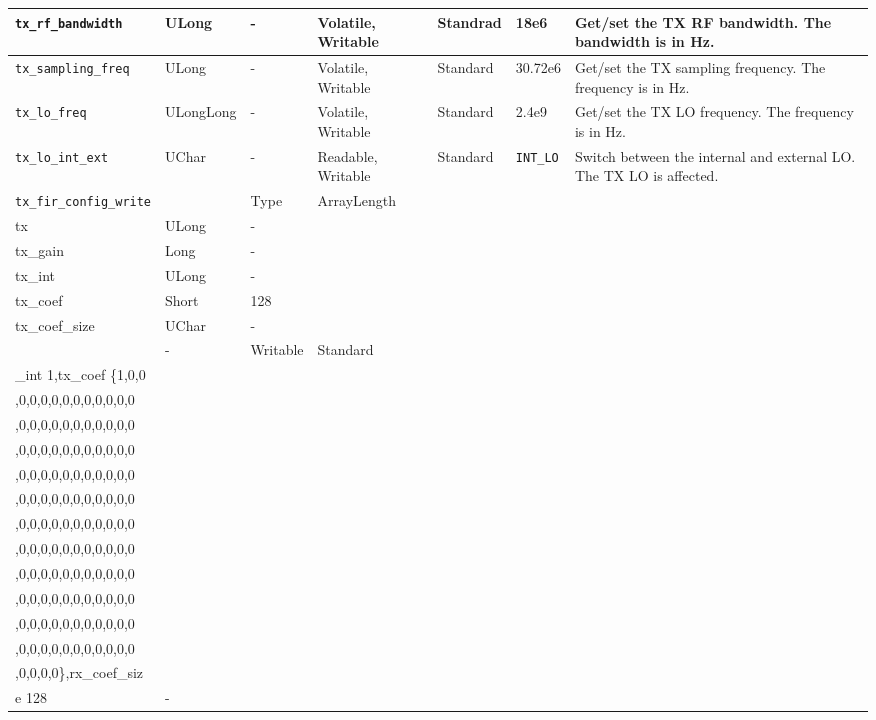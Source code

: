\documentclass{article}
\begin{document}
\begin{landscape}
\begin{scriptsize}
\begin{longtable}{|p{3.6cm}|p{8.1cm}|p{1.4cm}|p{1.3cm}|p{1.4cm}|p{2.5cm}|p{3.6cm}|}
			\hline
			\verb+tx_rf_bandwidth+ & ULong & - & Volatile, Writable & Standrad & 18e6 & Get/set the TX RF bandwidth. The bandwidth is in Hz. \\
			\hline
			\verb+tx_sampling_freq+ & ULong & - & Volatile, Writable & Standard & 30.72e6 & Get/set the TX sampling frequency. The frequency is in Hz. \\
			\hline
			\verb+tx_lo_freq+ & ULongLong & - & Volatile, Writable & Standard & 2.4e9 & Get/set the TX LO frequency. The frequency is in Hz. \\
			\hline
			\verb+tx_lo_int_ext+ & UChar & - & Readable, Writable & Standard & \verb+INT_LO+ & Switch between the internal and external LO. The TX LO is affected. \\
			\hline
			\verb+tx_fir_config_write+ & \begin{tabular}{|p{2.2cm}|p{2.7cm}|p{1.7cm}|} \hline \cellcolor{blue} Name & \cellcolor{blue}Type & \cellcolor{blue} ArrayLength \\ \hline tx & ULong & - \\ \hline tx\_gain & Long & - \\ \hline tx\_int & ULong & - \\ \hline tx\_coef & Short & 128 \\ \hline tx\_coef\_size & UChar & - \\ \hline\end{tabular} & - & Writable & Standard & \begin{tabular}{l}tx 0x03,tx\_gain 0,tx\\\_int 1,tx\_coef \{1,0,0\\,0,0,0,0,0,0,0,0,0,0,0\\,0,0,0,0,0,0,0,0,0,0,0\\,0,0,0,0,0,0,0,0,0,0,0\\,0,0,0,0,0,0,0,0,0,0,0\\,0,0,0,0,0,0,0,0,0,0,0\\,0,0,0,0,0,0,0,0,0,0,0\\,0,0,0,0,0,0,0,0,0,0,0\\,0,0,0,0,0,0,0,0,0,0,0\\,0,0,0,0,0,0,0,0,0,0,0\\,0,0,0,0,0,0,0,0,0,0,0\\,0,0,0,0,0,0,0,0,0,0,0\\,0,0,0,0\},rx\_coef\_siz\\e 128\end{tabular} & - \\
			\hline

\end{longtable}
\end{scriptsize}
\end{landscape}
\end{document}

